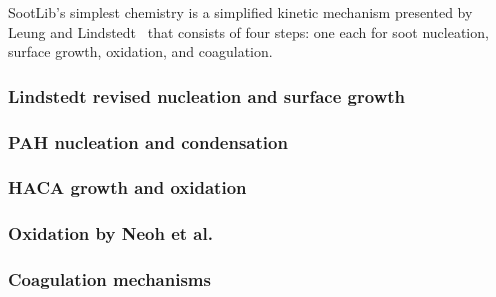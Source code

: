 \documentclass[preprint,12pt,letterpaper]{elsarticle}
\begin{document}
SootLib's simplest chemistry is a simplified kinetic mechanism presented by Leung and Lindstedt~\cite{Leung_1991} that consists of four steps: one each for soot nucleation, surface growth, oxidation, and coagulation.

\subsubsection{Lindstedt revised nucleation and surface growth}
\label{sss:LIN}

\subsubsection{PAH nucleation and condensation}
\label{sss:PAH}

\subsubsection{HACA growth and oxidation}
\label{sss:HACA}

\subsubsection{Oxidation by Neoh et al.}
\label{sss:X_NEOH}

\subsubsection{Coagulation mechanisms}
\label{sss:FUCHS_FRENK}

%
%
%
%
%
\end{document}
